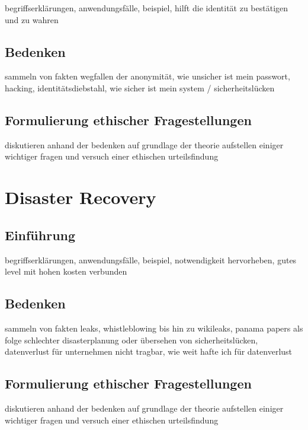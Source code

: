 \documentclass[letterpaper, 12pt]{article}
\let\tempsection\section
\renewcommand\section[1]{\vspace{-0.3cm}\tempsection{#1}\vspace{-0.3cm}}
\let\tempsubsection\subsection
\renewcommand\subsection[1]{\vspace{0cm}\tempsubsection{#1}\vspace{0cm}}
\begin{document}
begriffserklärungen, anwendungsfälle, beispiel, hilft die identität zu bestätigen und zu wahren

\subsection{Bedenken}

sammeln von fakten \newline
wegfallen der anonymität, wie unsicher ist mein passwort, hacking, identitätsdiebstahl, wie sicher ist mein system / sicherheitslücken

\subsection{Formulierung ethischer Fragestellungen}

diskutieren anhand der bedenken auf grundlage der theorie \newline
aufstellen einiger wichtiger fragen und versuch einer ethischen urteilsfindung

\clearpage

\section{Disaster Recovery}

\subsection{Einführung}

begriffserklärungen, anwendungsfälle, beispiel, notwendigkeit hervorheben, gutes level mit hohen kosten verbunden

\subsection{Bedenken}

sammeln von fakten \newline
leaks, whistleblowing bis hin zu wikileaks, panama papers als folge schlechter disasterplanung oder übersehen von sicherheitslücken, datenverlust für unternehmen nicht tragbar, wie weit hafte ich für datenverlust

\subsection{Formulierung ethischer Fragestellungen}

diskutieren anhand der bedenken auf grundlage der theorie \newline
aufstellen einiger wichtiger fragen und versuch einer ethischen urteilsfindung
\end{document}
